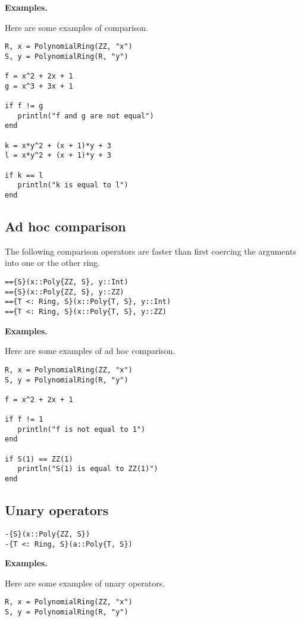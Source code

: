 \documentclass[a4paper,10pt]{article}
\begin{document}
{{{{{{\textbf{Examples.}

Here are some examples of comparison.

\begin{lstlisting}
R, x = PolynomialRing(ZZ, "x")
S, y = PolynomialRing(R, "y")

f = x^2 + 2x + 1
g = x^3 + 3x + 1

if f != g
   println("f and g are not equal")
end

k = x*y^2 + (x + 1)*y + 3
l = x*y^2 + (x + 1)*y + 3

if k == l
   println("k is equal to l")
end
\end{lstlisting}

\subsection{Ad hoc comparison}

The following comparison operators are faster than first coercing the arguments
into one or the other ring.

\begin{lstlisting}
=={S}(x::Poly{ZZ, S}, y::Int)
=={S}(x::Poly{ZZ, S}, y::ZZ)
=={T <: Ring, S}(x::Poly{T, S}, y::Int)
=={T <: Ring, S}(x::Poly{T, S}, y::ZZ)
\end{lstlisting}

\textbf{Examples.}

Here are some examples of ad hoc comparison.

\begin{lstlisting}
R, x = PolynomialRing(ZZ, "x")
S, y = PolynomialRing(R, "y")

f = x^2 + 2x + 1

if f != 1
   println("f is not equal to 1")
end

if S(1) == ZZ(1)
   println("S(1) is equal to ZZ(1)")
end
\end{lstlisting}

\subsection{Unary operators}

\begin{lstlisting}
-{S}(x::Poly{ZZ, S})
-{T <: Ring, S}(a::Poly{T, S})
\end{lstlisting}

\textbf{Examples.}

Here are some examples of unary operators.

\begin{lstlisting}
R, x = PolynomialRing(ZZ, "x")
S, y = PolynomialRing(R, "y")


\end{lstlisting}}}}}}}
\end{document}
